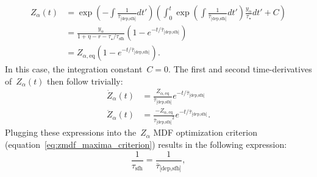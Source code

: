 \documentclass[12pt]{article}
\newcommand{\timescale}[1]{\ensuremath{\tau_\text{#1}}}
\newcommand{\harmonic}[2]{\ensuremath{\bar{\tau}_\text{[#1,#2]}}}
\begin{document}
\begin{subequations}\begin{align}
Z_\alpha(t) &= \exp\left(-\int \frac{1}{\harmonic{dep}{sfh}}dt'\right)
\left(
\int_0^t \exp\left(\int \frac{1}{\harmonic{dep}{sfh}}dt'\right)
\frac{y_\alpha}{\tau_\star} dt' + C
\right)
\\
&= \frac{y_\alpha}{1 + \eta - r - \tau_\star / \timescale{sfh}}
\left(1 - e^{-t / \harmonic{dep}{sfh}}\right)
\\
&= Z_{\alpha,\text{eq}}\left(1 - e^{-t / \harmonic{dep}{sfh}}\right).
\end{align}\end{subequations}
In this case, the integration constant~$C = 0$.
The first and second time-derivatives of~$Z_\alpha(t)$ then follow trivially:
\begin{subequations}\begin{align}
\dot{Z}_\alpha(t) &= \frac{Z_{\alpha, \text{eq}}}{\harmonic{dep}{sfh}}
e^{-t / \harmonic{dep}{sfh}}
\\
\ddot{Z}_\alpha(t) &= \frac{-Z_{\alpha, \text{eq}}}{\harmonic{dep}{sfh}^2}
e^{-t / \harmonic{dep}{sfh}}.
\end{align}\end{subequations}
Plugging these expressions into the~$Z_\alpha$ MDF optimization criterion
(equation~\ref{eq:zmdf_maxima_criterion}) results in the following expression:
\begin{equation}
\frac{1}{\timescale{sfh}} = \frac{1}{\harmonic{dep}{sfh}},
\end{equation}
\end{document}
